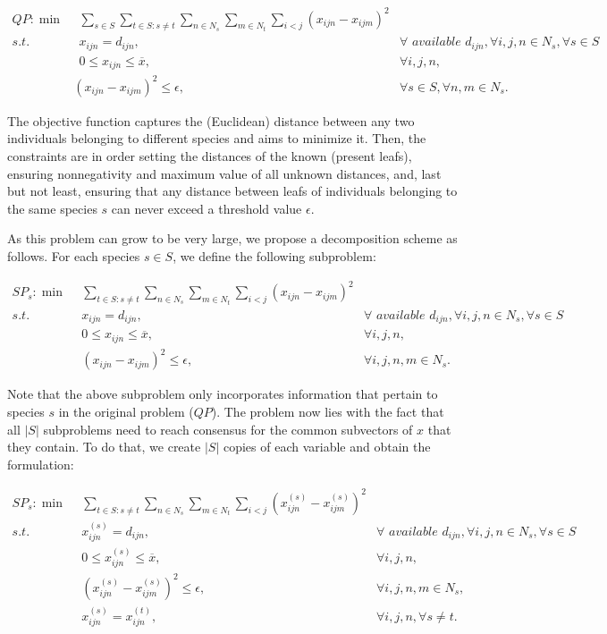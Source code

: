 \documentclass[12pt]{amsart}
\begin{document}
\begin{align}
	QP: \min &~~ \sum\limits_{s\in S}\sum\limits_{t\in S: s\neq t} \sum\limits_{n\in N_s} \sum\limits_{m\in N_t} \sum\limits_{i<j} (x_{ijn}-x_{ijm})^2 \\
	s.t. &~~ x_{ijn} = d_{ijn}, & \forall \textit{ available } d_{ijn}, \forall i,j,n\in N_s, \forall s\in S \\
	&~~ 0\leq x_{ijn}\leq \overline{x}, &\forall i,j,n, \\
	& (x_{ijn}-x_{ijm})^2 \leq \epsilon, &\forall s\in S, \forall n,m\in N_s. 
\end{align}

The objective function captures the (Euclidean) distance between any two individuals belonging to different species and aims to minimize it. Then, the constraints are in order setting the distances of the known (present leafs), ensuring nonnegativity and maximum value of all unknown distances, and, last but not least, ensuring that any distance between leafs of individuals belonging to the same species $s$ can never exceed a threshold value $\epsilon$. 

As this problem can grow to be very large, we propose a decomposition scheme as follows. For each species $s\in S$, we define the following subproblem: 

\begin{align}
	SP_s: \min &~~ \sum\limits_{t\in S: s\neq t} \sum\limits_{n\in N_s} \sum\limits_{m\in N_t} \sum\limits_{i<j} (x_{ijn}-x_{ijm})^2 \\
	s.t. &~~ x_{ijn} = d_{ijn}, & \forall \textit{ available } d_{ijn}, \forall i,j,n\in N_s, \forall s\in S \\
	&~~ 0\leq x_{ijn}\leq \overline{x}, &\forall i,j,n, \\
	&~~ (x_{ijn}-x_{ijm})^2 \leq \epsilon, & \forall i,j, n,m\in N_s. 
\end{align}

Note that the above subproblem only incorporates information that pertain to species $s$ in the original problem ($QP$). The problem now lies with the fact that all $|S|$ subproblems need to reach consensus for the common subvectors of $x$ that they contain. To do that, we create $|S|$ copies of each variable and obtain the formulation: 

\begin{align}
	SP_s: \min &~~ \sum\limits_{t\in S: s\neq t} \sum\limits_{n\in N_s} \sum\limits_{m\in N_t} \sum\limits_{i<j} (x^{(s)}_{ijn}-x^{(s)}_{ijm})^2 \\
	s.t. &~~ x^{(s)}_{ijn} = d_{ijn}, & \forall \textit{ available } d_{ijn}, \forall i,j,n\in N_s, \forall s\in S \\
	&~~ 0\leq x^{(s)}_{ijn}\leq \overline{x}, &\forall i,j,n, \\
	&~~ (x^{(s)}_{ijn}-x^{(s)}_{ijm})^2 \leq \epsilon, & \forall i,j, n,m\in N_s, \\
	&~~ x^{(s)}_{ijn} = x^{(t)}_{ijn}, & \forall i, j, n, \forall s\neq t.
\end{align}
\end{document}
